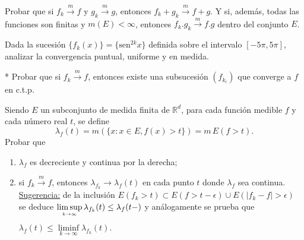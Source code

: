 \documentclass{book}
\newcommand{\rr}{\mathbb{R}}
\begin{document}



\begin{ejer}{} Probar que si $f_k \stackrel{m}{\rightarrow}f$ \;y\; $g_k \stackrel{m}{\rightarrow}g$, entonces \;
$f_k+g_k \stackrel{m}{\rightarrow}f+g$.  
Y si, además, todas las funciones son finitas y $m(E)<\infty$, entonces $f_k.g_k \stackrel{m} \rightarrow f.g$
dentro del conjunto $E$.
\end{ejer}

\begin{ejer}{} 
Dada la sucesión $\{f_k(x)\}=\{\text{sen}^{2k} x\}$ definida sobre el intervalo $[-5 \pi, 5\pi]$, 
analizar  la convergencia puntual, uniforme y en medida.
\end{ejer}


\begin{ejer}{}* 
Probar que si $f_k \stackrel{m}{\rightarrow}f$, \;entonces existe una subsucesión $(f_{k_i})$ que 
converge a $f$ en c.t.p.
\end{ejer}

\begin{ejer}{} 
 Siendo $E$ un subconjunto de medida finita de $\rr^d$,\;  para cada función medible $f$
y cada n\'umero real $t$, se define
$$\lambda_f(t)=m(\{x:x\in E,f(x)>t\})=m\,E(f>t).$$
Probar que 
	\begin{enumerate}
  \item $\lambda_f$ es decreciente y continua por la derecha;
  \item si $f_k \stackrel {m}{\rightarrow}f$, entonces $\lambda_{f_k} \rightarrow \lambda_f(t)$
  en cada punto $t$ donde $\lambda_f$ sea continua.
\\
  \underline{Sugerencia:}
de la inclusión $E(f_k>t)\subset E(f>t-\epsilon)\cup E(|f_k-f|>\epsilon) $
se deduce \;$\limsup\limits_{{k\rightarrow \infty}\atop} \lambda_{f_k}(t)\leq \lambda_{f}(t-)$\; y análogamente se prueba que 
\;$\lambda_f(t)\leq \liminf\limits_{k\rightarrow \infty} \lambda_{f_k}(t).\;$
	\end{enumerate}
\end{ejer}

\end{document}
